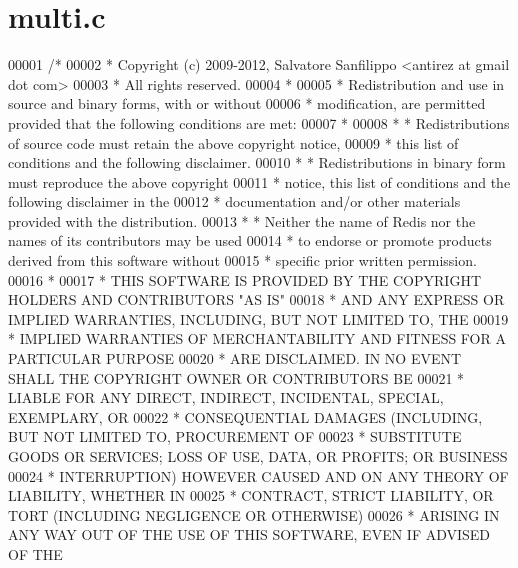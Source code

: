 \hypertarget{multi_8c_source}{}\section{multi.\+c}
\label{multi_8c_source}

\begin{DoxyCode}
00001 \textcolor{comment}{/*}
00002 \textcolor{comment}{ * Copyright (c) 2009-2012, Salvatore Sanfilippo <antirez at gmail dot com>}
00003 \textcolor{comment}{ * All rights reserved.}
00004 \textcolor{comment}{ *}
00005 \textcolor{comment}{ * Redistribution and use in source and binary forms, with or without}
00006 \textcolor{comment}{ * modification, are permitted provided that the following conditions are met:}
00007 \textcolor{comment}{ *}
00008 \textcolor{comment}{ *   * Redistributions of source code must retain the above copyright notice,}
00009 \textcolor{comment}{ *     this list of conditions and the following disclaimer.}
00010 \textcolor{comment}{ *   * Redistributions in binary form must reproduce the above copyright}
00011 \textcolor{comment}{ *     notice, this list of conditions and the following disclaimer in the}
00012 \textcolor{comment}{ *     documentation and/or other materials provided with the distribution.}
00013 \textcolor{comment}{ *   * Neither the name of Redis nor the names of its contributors may be used}
00014 \textcolor{comment}{ *     to endorse or promote products derived from this software without}
00015 \textcolor{comment}{ *     specific prior written permission.}
00016 \textcolor{comment}{ *}
00017 \textcolor{comment}{ * THIS SOFTWARE IS PROVIDED BY THE COPYRIGHT HOLDERS AND CONTRIBUTORS "AS IS"}
00018 \textcolor{comment}{ * AND ANY EXPRESS OR IMPLIED WARRANTIES, INCLUDING, BUT NOT LIMITED TO, THE}
00019 \textcolor{comment}{ * IMPLIED WARRANTIES OF MERCHANTABILITY AND FITNESS FOR A PARTICULAR PURPOSE}
00020 \textcolor{comment}{ * ARE DISCLAIMED. IN NO EVENT SHALL THE COPYRIGHT OWNER OR CONTRIBUTORS BE}
00021 \textcolor{comment}{ * LIABLE FOR ANY DIRECT, INDIRECT, INCIDENTAL, SPECIAL, EXEMPLARY, OR}
00022 \textcolor{comment}{ * CONSEQUENTIAL DAMAGES (INCLUDING, BUT NOT LIMITED TO, PROCUREMENT OF}
00023 \textcolor{comment}{ * SUBSTITUTE GOODS OR SERVICES; LOSS OF USE, DATA, OR PROFITS; OR BUSINESS}
00024 \textcolor{comment}{ * INTERRUPTION) HOWEVER CAUSED AND ON ANY THEORY OF LIABILITY, WHETHER IN}
00025 \textcolor{comment}{ * CONTRACT, STRICT LIABILITY, OR TORT (INCLUDING NEGLIGENCE OR OTHERWISE)}
00026 \textcolor{comment}{ * ARISING IN ANY WAY OUT OF THE USE OF THIS SOFTWARE, EVEN IF ADVISED OF THE}

\end{DoxyCode}
